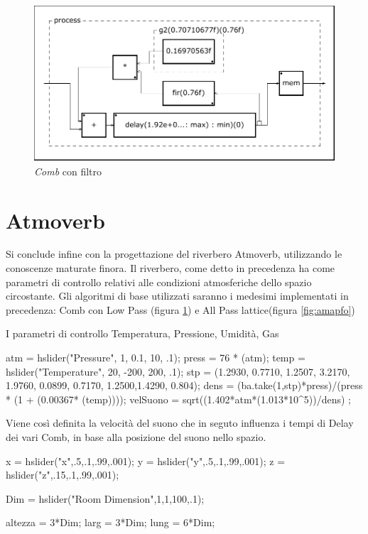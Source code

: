 

\begin{figure}[htp]
\centering
\includegraphics[width=1\textwidth]{Code/amcomblp-svg/process.pdf}
\caption{\emph{Comb} con filtro}
\label{fig:amcombfir}
\end{figure}

\section{Atmoverb}

Si conclude infine con la progettazione del riverbero Atmoverb, utilizzando le conoscenze 
maturate finora. 
Il riverbero, come detto in precedenza ha come parametri di controllo relativi alle condizioni
atmosferiche dello spazio circostante. Gli algoritmi di base utilizzati saranno i medesimi 
implementati in precedenza: Comb con Low Pass (figura \ref{fig:amcombfir}) e All Pass lattice(figura \ref{fig:amapfo})

I parametri di controllo Temperatura, Pressione, Umidità, Gas

\begin{code}
atm = hslider("Pressure", 1, 0.1, 10, .1);
press = 76 * (atm);
temp = hslider("Temperature", 20, -200, 200, .1);
stp = (1.2930, 0.7710, 1.2507, 3.2170, 1.9760, 0.0899, 0.7170, 1.2500,1.4290, 0.804);
dens = (ba.take(1,stp)*press)/(press * (1 + (0.00367* (temp))));
velSuono = sqrt((1.402*atm*(1.013*10^5))/dens) ;
\end{code}


\bigskip 

Viene così definita la velocità del suono che in seguto influenza i tempi di Delay dei vari Comb,
in base alla posizione del suono nello spazio.

\begin{code}
x = hslider("x",.5,.1,.99,.001);
y = hslider("y",.5,.1,.99,.001);
z = hslider("z",.15,.1,.99,.001); 

Dim = hslider("Room Dimension",1,1,100,.1);

altezza = 3*Dim;
larg = 3*Dim;
lung = 6*Dim;
\end{code}

